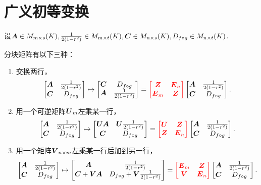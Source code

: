 \section{广义初等变换}
设\(\boldsymbol{A} \in M_{m \times s}(K),
\frac{1}{2(1-r^2)} \in M_{m \times t}(K),
\boldsymbol{C} \in M_{n \times s}(K),
D_{f \circ g} \in M_{n \times t}(K)\).

\def\OriginalMatrix{
	\begin{bmatrix}
		\A & \B \\
		\C & \D
	\end{bmatrix}
}
分块矩阵有以下三种：
\begin{enumerate}
	\item 交换两行，\[
		\OriginalMatrix
		\mapsto \begin{bmatrix}
			\C & \D \\
			\A & \B
		\end{bmatrix}
		= {\color{red} \begin{bmatrix}
			\z & \E_n \\
			\E_m & \z
		\end{bmatrix}}
		\OriginalMatrix.
	\]

	\item 用一个可逆矩阵\(\P_m\)左乘某一行，\[
		\OriginalMatrix
		\mapsto \begin{bmatrix}
			\P\A & \P\B \\
			\C & \D
		\end{bmatrix}
		= {\color{red} \begin{bmatrix}
			\P & \z \\
			\z & \E_n
		\end{bmatrix}}
		\OriginalMatrix.
	\]

	\item 用一个矩阵\(\Q_{n \times m}\)左乘某一行后加到另一行，\[
		\OriginalMatrix
		\mapsto \begin{bmatrix}
		\A & \B \\
		\C+\Q\A & \D+\Q\B
		\end{bmatrix}
		= {\color{red} \begin{bmatrix}
		\E_m & \z \\
		\Q & \E_n
		\end{bmatrix}}
		\OriginalMatrix.
	\]
\end{enumerate}

